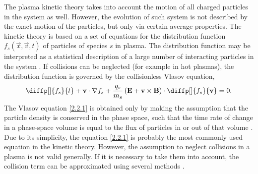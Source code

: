 The plasma kinetic theory takes into account the motion of all charged particles in the system as well. However, the evolution of such system is not described by the exact motion of the particles, but only via certain average properties. The kinetic theory is based on a set of equations for the distribution function $ f_s \left(\vec{x}, \vec{v}, t \right) $ of particles of species $ s $ in plasma. The distribution function may be interpreted as a statistical description of a large number of interacting particles in the system \cite{nicholson}. If collisions can be neglected (for example in hot plasmas), the distribution function is governed by the collisionless Vlasov equation,
\begin{equation}
\label{2.2.1}
\diffp[]{f_{s}}{t} + \vec{v} \cdot \nabla f_s + \frac{q_{s}}{m_{s}}\left( \vec{E} + \vec{v} \times \vec{B} \right) \cdot \diffp[]{f_s}{\vec{v}} = 0.
\end{equation}
The Vlasov equation \ref{2.2.1} is obtained only by making the assumption that the particle density is conserved in the phase space, such that the time rate of change in a phase-space volume is equal to the flux of particles in or out of that volume \cite{nicholson}. Due to its simplicity, the equation \ref{2.2.1} is probably the most commonly used equation in the kinetic theory. However, the assumption to neglect collisions in a plasma is not valid generally. If it is necessary to take them into account, the collision term can be approximated using several methods \cite{Smirnov2008, nicholson, Chen1984, Drake2006, Boyd2003}.
 
